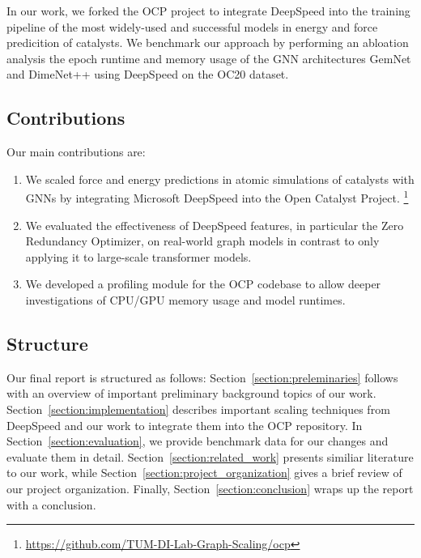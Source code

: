 In our work, we forked the OCP project to integrate DeepSpeed into the training pipeline of the most widely-used 
and successful models in energy and force predicition of catalysts. 
We benchmark our approach by performing an abloation analysis the epoch runtime and memory usage of the GNN architectures GemNet and 
DimeNet++ using DeepSpeed on the OC20 dataset.


\subsection{Contributions}

Our main contributions are:

\begin{enumerate}
    \item We scaled force and energy predictions in atomic simulations of catalysts with GNNs 
    by integrating Microsoft DeepSpeed into the Open Catalyst Project.
    \footnote{\url{https://github.com/TUM-DI-Lab-Graph-Scaling/ocp}}
    \item We evaluated the effectiveness of DeepSpeed features, in particular the Zero Redundancy Optimizer, on 
    real-world graph models in contrast to only applying it to large-scale transformer models.
    \item We developed a profiling module for the OCP codebase to allow deeper investigations of CPU/GPU memory 
    usage and model runtimes.
\end{enumerate}

\subsection{Structure}

Our final report is structured as follows: Section~\ref{section:preleminaries} follows with an overview of 
important preliminary background topics of our work. Section~\ref{section:implementation} describes important 
scaling techniques from DeepSpeed and our work to integrate them into the OCP repository. In 
Section~\ref{section:evaluation}, we provide benchmark data for our changes and evaluate them in detail. 
Section~\ref{section:related_work} presents similiar literature to our work, while Section~\ref{section:project_organization} 
gives a brief review of our project organization. Finally, Section~\ref{section:conclusion} wraps up the 
report with a conclusion.